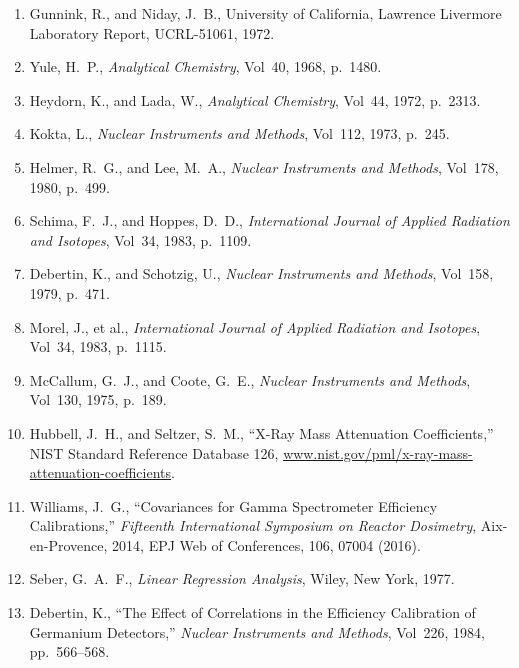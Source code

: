 \documentclass[12pt]{article}
\begin{document}
\begin{enumerate}[label=(\arabic*),leftmargin=3em]
  \item Gunnink, R., and Niday, J.~B., University of California, Lawrence Livermore
        Laboratory Report, UCRL-51061, 1972.

  \item Yule, H.~P., \textit{Analytical Chemistry}, Vol~40, 1968, p.~1480.

  \item Heydorn, K., and Lada, W., \textit{Analytical Chemistry}, Vol~44, 1972, p.~2313.

  \item Kokta, L., \textit{Nuclear Instruments and Methods}, Vol~112, 1973, p.~245.

  \item Helmer, R.~G., and Lee, M.~A., \textit{Nuclear Instruments and Methods},
        Vol~178, 1980, p.~499.

  \item Schima, F.~J., and Hoppes, D.~D., \textit{International Journal of Applied
        Radiation and Isotopes}, Vol~34, 1983, p.~1109.

  \item Debertin, K., and Schotzig, U., \textit{Nuclear Instruments and Methods},
        Vol~158, 1979, p.~471.

  \item Morel, J., et al., \textit{International Journal of Applied Radiation and
        Isotopes}, Vol~34, 1983, p.~1115.

  \item McCallum, G.~J., and Coote, G.~E., \textit{Nuclear Instruments and Methods},
        Vol~130, 1975, p.~189.

  \item Hubbell, J.~H., and Seltzer, S.~M., ``X-Ray Mass Attenuation Coefficients,''
        NIST Standard Reference Database 126,
        \url{www.nist.gov/pml/x-ray-mass-attenuation-coefficients}.

  \item Williams, J.~G., ``Covariances for Gamma Spectrometer Efficiency Calibrations,''
        \textit{Fifteenth International Symposium on Reactor Dosimetry},
        Aix-en-Provence, 2014, EPJ Web of Conferences, 106, 07004 (2016).

  \item Seber, G.~A.~F., \textit{Linear Regression Analysis}, Wiley, New York, 1977.

  \item Debertin, K., ``The Effect of Correlations in the Efficiency Calibration of
        Germanium Detectors,'' \textit{Nuclear Instruments and Methods}, Vol~226, 1984,
        pp.~566--568.


\end{enumerate}
\end{document}
